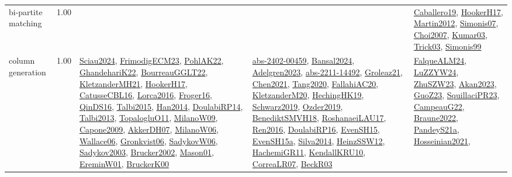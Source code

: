 {\begin{longtable}{p{3cm}r>{\raggedright\arraybackslash}p{6cm}>{\raggedright\arraybackslash}p{6cm}>{\raggedright\arraybackslash}p{8cm}}
\index{bi-partite matching}\index{Algorithms!bi-partite matching}bi-partite matching &  1.00 &  &  & \hyperref[detail:Caballero19]{Caballero19}, \hyperref[detail:HookerH17]{HookerH17}, \hyperref[detail:Martin2012]{Martin2012}, \hyperref[detail:Simonis07]{Simonis07}, \hyperref[detail:Choi2007]{Choi2007}, \hyperref[detail:Kumar03]{Kumar03}, \hyperref[detail:Trick03]{Trick03}, \hyperref[detail:Simonis99]{Simonis99}\\
\index{column generation}\index{Algorithms!column generation}column generation &  1.00 & \hyperref[detail:Sciau2024]{Sciau2024}, \hyperref[detail:FrimodigECM23]{FrimodigECM23}, \hyperref[detail:PohlAK22]{PohlAK22}, \hyperref[detail:GhandehariK22]{GhandehariK22}, \hyperref[detail:BourreauGGLT22]{BourreauGGLT22}, \hyperref[detail:KletzanderMH21]{KletzanderMH21}, \hyperref[detail:HookerH17]{HookerH17}, \hyperref[detail:CatusseCBL16]{CatusseCBL16}, \hyperref[detail:Lorca2016]{Lorca2016}, \hyperref[detail:Froger16]{Froger16}, \hyperref[detail:QinDS16]{QinDS16}, \hyperref[detail:Talbi2015]{Talbi2015}, \hyperref[detail:Han2014]{Han2014}, \hyperref[detail:DoulabiRP14]{DoulabiRP14}, \hyperref[detail:Talbi2013]{Talbi2013}, \hyperref[detail:TopalogluO11]{TopalogluO11}, \hyperref[detail:MilanoW09]{MilanoW09}, \hyperref[detail:Capone2009]{Capone2009}, \hyperref[detail:AkkerDH07]{AkkerDH07}, \hyperref[detail:MilanoW06]{MilanoW06}, \hyperref[detail:Wallace06]{Wallace06}, \hyperref[detail:Gronkvist06]{Gronkvist06}, \hyperref[detail:SadykovW06]{SadykovW06}, \hyperref[detail:Sadykov2003]{Sadykov2003}, \hyperref[detail:Brucker2002]{Brucker2002}, \hyperref[detail:Mason01]{Mason01}, \hyperref[detail:EreminW01]{EreminW01}, \hyperref[detail:BruckerK00]{BruckerK00} & \hyperref[detail:abs-2402-00459]{abs-2402-00459}, \hyperref[detail:Bansal2024]{Bansal2024}, \hyperref[detail:Adelgren2023]{Adelgren2023}, \hyperref[detail:abs-2211-14492]{abs-2211-14492}, \hyperref[detail:Groleaz21]{Groleaz21}, \hyperref[detail:Chen2021]{Chen2021}, \hyperref[detail:Tang2020]{Tang2020}, \hyperref[detail:FallahiAC20]{FallahiAC20}, \hyperref[detail:KletzanderM20]{KletzanderM20}, \hyperref[detail:HechingHK19]{HechingHK19}, \hyperref[detail:Schwarz2019]{Schwarz2019}, \hyperref[detail:Ozder2019]{Ozder2019}, \hyperref[detail:BenediktSMVH18]{BenediktSMVH18}, \hyperref[detail:RoshanaeiLAU17]{RoshanaeiLAU17}, \hyperref[detail:Ren2016]{Ren2016}, \hyperref[detail:DoulabiRP16]{DoulabiRP16}, \hyperref[detail:EvenSH15]{EvenSH15}, \hyperref[detail:EvenSH15a]{EvenSH15a}, \hyperref[detail:Silva2014]{Silva2014}, \hyperref[detail:HeinzSSW12]{HeinzSSW12}, \hyperref[detail:HachemiGR11]{HachemiGR11}, \hyperref[detail:KendallKRU10]{KendallKRU10}, \hyperref[detail:CorreaLR07]{CorreaLR07}, \hyperref[detail:BeckR03]{BeckR03} & \hyperref[detail:FalqueALM24]{FalqueALM24}, \hyperref[detail:LuZZYW24]{LuZZYW24}, \hyperref[detail:ZhuSZW23]{ZhuSZW23}, \hyperref[detail:Akan2023]{Akan2023}, \hyperref[detail:GuoZ23]{GuoZ23}, \hyperref[detail:SquillaciPR23]{SquillaciPR23}, \hyperref[detail:CampeauG22]{CampeauG22}, \hyperref[detail:Braune2022]{Braune2022}, \hyperref[detail:PandeyS21a]{PandeyS21a}, \hyperref[detail:Hosseinian2021]{Hosseinian2021}, 
\end{longtable}}
